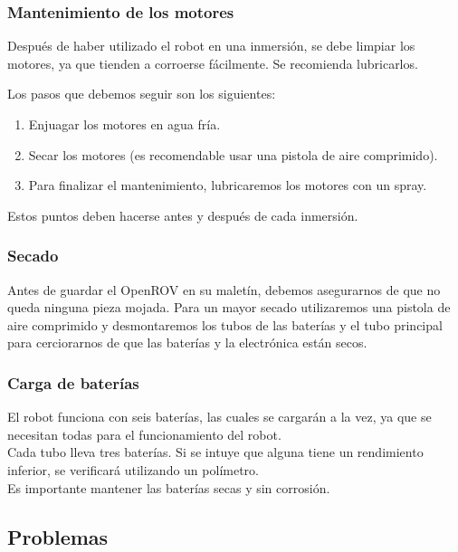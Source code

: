 \subsubsection{Mantenimiento de los motores}
\label{subsubsec:mantenimiento}
Después de haber utilizado el robot en una inmersión, se debe limpiar los motores, ya que tienden a corroerse fácilmente. Se recomienda lubricarlos.

Los pasos que debemos seguir son los siguientes:
\begin{enumerate}
\item Enjuagar los motores en agua fría.
\item Secar los motores (es recomendable usar una pistola de aire comprimido).
\item Para finalizar el mantenimiento, lubricaremos los motores con un spray.
\end{enumerate}
Estos puntos deben hacerse antes y después de cada inmersión.
  
\subsubsection{Secado}
\label{subsubsec:secado}
Antes de guardar el OpenROV en su maletín, debemos asegurarnos de que no queda ninguna pieza mojada.
Para un mayor secado utilizaremos una pistola de aire comprimido y desmontaremos los tubos de las baterías y el tubo principal para cerciorarnos de que las baterías y la electrónica están secos.
  
\subsubsection{Carga de baterías}
\label{subsubsec:bateria}
El robot funciona con seis baterías, las cuales se cargarán a la vez, ya que se necesitan todas para el funcionamiento del robot.
\\Cada tubo lleva tres baterías. Si se intuye que alguna tiene un rendimiento inferior, se verificará utilizando un polímetro.
\\Es importante mantener las baterías secas y sin corrosión.

\subsection{Problemas}
\label{subsec:problemas}


